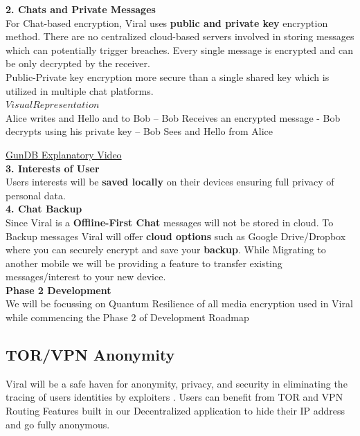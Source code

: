\documentclass[10pt]{article}
\begin{document}
\textbf{2. Chats and Private Messages}\\

For Chat-based encryption, Viral uses \textbf{public and private key} encryption method. There are no centralized cloud-based servers involved in storing messages which can potentially trigger breaches. Every single message is encrypted and can be only decrypted by the receiver.\\

Public-Private key encryption more secure than a single shared key which is utilized in multiple chat platforms.\\

$Visual Representation$\\

Alice writes and Hello and to Bob – Bob Receives an encrypted message - Bob decrypts using his private key – Bob Sees and Hello from Alice

\hyperlink{https://sample.com}{GunDB Explanatory Video}\\

\textbf{3. Interests of User}\\

Users\textsc{} interests will be \textbf{saved locally} on their devices ensuring full privacy of personal data.\\

\textbf{4. Chat Backup}\\

Since Viral is a \textbf{Offline-First Chat} messages will not be stored in cloud. To Backup messages Viral will offer \textbf{cloud options} such as Google Drive/Dropbox where you can securely encrypt and save your \textbf{backup}. While Migrating to another mobile we will be providing a feature to transfer existing messages/interest to your new device.\\

\textbf{Phase 2 Development}\\

We will be focussing on Quantum Resilience of all media encryption used in Viral while commencing the Phase 2 of Development Roadmap\\

\subsection{TOR/VPN Anonymity}

Viral will be a safe haven for anonymity, privacy, and security in eliminating the tracing of users\textsc{} identities by exploiters . Users can benefit from TOR and VPN Routing Features built in our Decentralized application to hide their IP address and go fully anonymous.\\
\end{document}
